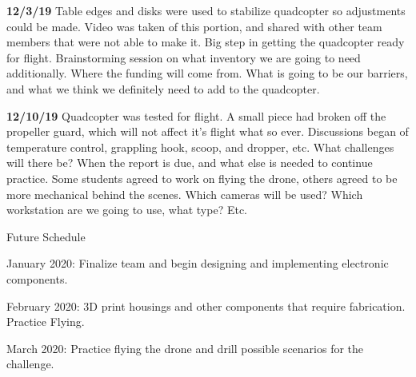 \textbf{12/3/19}    Table edges and disks were used to stabilize quadcopter so adjustments could be made. Video was taken of this portion, and shared with other team members that were not able to make it. Big step in getting the quadcopter ready for flight. Brainstorming session on what inventory we are going to need additionally. Where the funding will come from. What is going to be our barriers, and what we think we definitely need to add to the quadcopter.

\textbf{12/10/19}    Quadcopter was tested for flight. A small piece had broken off the propeller guard, which will not affect it's flight what so ever. Discussions began of temperature control, grappling hook, scoop, and dropper, etc. What challenges will there be? When the report is due, and what else is needed to continue practice. Some students agreed to work on flying the drone, others agreed to be more mechanical behind the scenes. Which cameras will be used? Which workstation are we going to use, what type? Etc.

Future Schedule

January 2020: Finalize team and begin designing and implementing electronic components.

February 2020: 3D print housings and other components that require fabrication. Practice Flying.

March 2020: Practice flying the drone and drill possible scenarios for the challenge.


\nocite{*}




%

